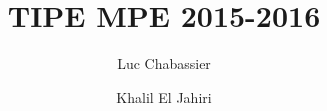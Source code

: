 
\title{TIPE MPE 2015-2016}
\author{Luc Chabassier \and Khalil El Jahiri}
\maketitle
{}

\tableofcontents
\listoftodos

